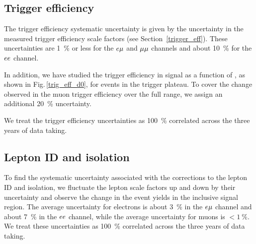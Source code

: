 \subsection{Trigger efficiency}
The trigger efficiency systematic uncertainty is given by the uncertainty in the measured trigger efficiency scale factors (see Section~\ref{trigger_eff}). These uncertainties are \SI{1}{\percent} or less for the $e{\mu}$ and ${\mu}{\mu}$ channels and about \SI{10}{\percent} for the $ee$ channel.

In addition, we have studied the trigger efficiency in signal as a function of \ad, as shown in Fig.\,\ref{trig_eff_d0}, for events in the trigger \pt plateau. To cover the change observed in the muon trigger efficiency over the full \ad range, we assign an additional \SI{20}{\percent} uncertainty.

We treat the trigger efficiency uncertainties as \SI{100}{\percent} correlated across the three years of data taking.



\subsection{Lepton ID and isolation}
To find the systematic uncertainty associated with the corrections to the lepton ID and isolation, we fluctuate the lepton scale factors up and down by their uncertainty and observe the change in the event yields in the inclusive signal region. The average uncertainty for electrons is about \SI{3}{\percent} in the $e{\mu}$ channel and about \SI{7}{\percent} in the $ee$ channel, while the average uncertainty for muons is $< \SI{1}{\percent}$. We treat these uncertainties as \SI{100}{\percent} correlated across the three years of data taking.

